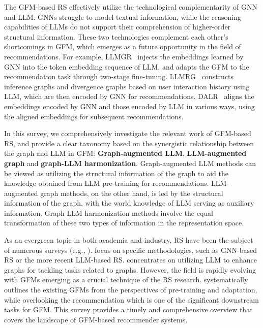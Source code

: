 The GFM-based RS effectively utilize the technological complementarity of GNN and LLM. GNNs struggle to model textual information, while the reasoning capabilities of LLMs do not support their comprehension of higher-order structural information. These two technologies complement each other's shortcomings in GFM, which emerges as a future opportunity in the field of recommendations. For example, LLMGR~\cite{guo2024integrating} injects the embeddings learned by GNN into the token embedding sequence of LLM, and adapts the GFM to the recommendation task through two-stage fine-tuning. LLMRG~\cite{wang2023enhancing} constructs inference graphs and divergence graphs based on user interaction history using LLM, which are then encoded by GNN for recommendations. DALR~\cite{peng2024denoising} aligns the embeddings encoded by GNN and those encoded by LLM in various ways, using the aligned embeddings for subsequent recommendations.

In this survey, we comprehensively investigate the relevant work of GFM-based RS, and provide a clear taxonomy based on the synergistic relationship between the graph and LLM in GFM: \textbf{Graph-augmented LLM}, \textbf{LLM-augmented graph} and \textbf{graph-LLM harmonization}.
Graph-augmented LLM methods can be viewed as utilizing the structural information of the graph to aid the knowledge obtained from LLM pre-training for recommendations. LLM-augmented graph methods, on the other hand, is led by the structural information of the graph, with the world knowledge of LLM serving as auxiliary information. Graph-LLM harmonization methods involve the equal transformation of these two types of information in the representation space. 


As an evergreen topic in both academia and industry, RS have been the subject of numerous surveys (e.g., \cite{gao2023survey,wu2024survey,liu2023towards,li2023survey}). \cite{gao2023survey,wu2024survey} focus on specific methodologies, such as GNN-based RS or the more recent LLM-based RS. \cite{li2023survey} concentrates on utilizing LLM to enhance graphs for tackling tasks related to graphs. However, the field is rapidly evolving with GFMs emerging as a crucial technique of the RS research. \cite{liu2023towards} systematically outlines the existing GFMs from the perspectives of pre-training and adaptation, while overlooking the recommendation which is one of the significant downstream tasks for GFM. This survey provides a timely and comprehensive overview that covers the landscape of GFM-based recommender systems.

